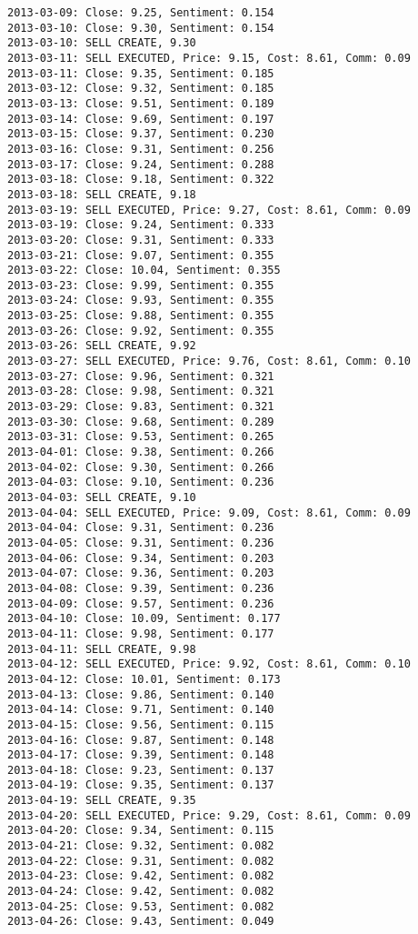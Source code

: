 \documentclass[11pt]{article}
\begin{document}
\begin{Verbatim}[commandchars=\\\{\}]
2013-03-09: Close: 9.25, Sentiment: 0.154
2013-03-10: Close: 9.30, Sentiment: 0.154
2013-03-10: SELL CREATE, 9.30
2013-03-11: SELL EXECUTED, Price: 9.15, Cost: 8.61, Comm: 0.09
2013-03-11: Close: 9.35, Sentiment: 0.185
2013-03-12: Close: 9.32, Sentiment: 0.185
2013-03-13: Close: 9.51, Sentiment: 0.189
2013-03-14: Close: 9.69, Sentiment: 0.197
2013-03-15: Close: 9.37, Sentiment: 0.230
2013-03-16: Close: 9.31, Sentiment: 0.256
2013-03-17: Close: 9.24, Sentiment: 0.288
2013-03-18: Close: 9.18, Sentiment: 0.322
2013-03-18: SELL CREATE, 9.18
2013-03-19: SELL EXECUTED, Price: 9.27, Cost: 8.61, Comm: 0.09
2013-03-19: Close: 9.24, Sentiment: 0.333
2013-03-20: Close: 9.31, Sentiment: 0.333
2013-03-21: Close: 9.07, Sentiment: 0.355
2013-03-22: Close: 10.04, Sentiment: 0.355
2013-03-23: Close: 9.99, Sentiment: 0.355
2013-03-24: Close: 9.93, Sentiment: 0.355
2013-03-25: Close: 9.88, Sentiment: 0.355
2013-03-26: Close: 9.92, Sentiment: 0.355
2013-03-26: SELL CREATE, 9.92
2013-03-27: SELL EXECUTED, Price: 9.76, Cost: 8.61, Comm: 0.10
2013-03-27: Close: 9.96, Sentiment: 0.321
2013-03-28: Close: 9.98, Sentiment: 0.321
2013-03-29: Close: 9.83, Sentiment: 0.321
2013-03-30: Close: 9.68, Sentiment: 0.289
2013-03-31: Close: 9.53, Sentiment: 0.265
2013-04-01: Close: 9.38, Sentiment: 0.266
2013-04-02: Close: 9.30, Sentiment: 0.266
2013-04-03: Close: 9.10, Sentiment: 0.236
2013-04-03: SELL CREATE, 9.10
2013-04-04: SELL EXECUTED, Price: 9.09, Cost: 8.61, Comm: 0.09
2013-04-04: Close: 9.31, Sentiment: 0.236
2013-04-05: Close: 9.31, Sentiment: 0.236
2013-04-06: Close: 9.34, Sentiment: 0.203
2013-04-07: Close: 9.36, Sentiment: 0.203
2013-04-08: Close: 9.39, Sentiment: 0.236
2013-04-09: Close: 9.57, Sentiment: 0.236
2013-04-10: Close: 10.09, Sentiment: 0.177
2013-04-11: Close: 9.98, Sentiment: 0.177
2013-04-11: SELL CREATE, 9.98
2013-04-12: SELL EXECUTED, Price: 9.92, Cost: 8.61, Comm: 0.10
2013-04-12: Close: 10.01, Sentiment: 0.173
2013-04-13: Close: 9.86, Sentiment: 0.140
2013-04-14: Close: 9.71, Sentiment: 0.140
2013-04-15: Close: 9.56, Sentiment: 0.115
2013-04-16: Close: 9.87, Sentiment: 0.148
2013-04-17: Close: 9.39, Sentiment: 0.148
2013-04-18: Close: 9.23, Sentiment: 0.137
2013-04-19: Close: 9.35, Sentiment: 0.137
2013-04-19: SELL CREATE, 9.35
2013-04-20: SELL EXECUTED, Price: 9.29, Cost: 8.61, Comm: 0.09
2013-04-20: Close: 9.34, Sentiment: 0.115
2013-04-21: Close: 9.32, Sentiment: 0.082
2013-04-22: Close: 9.31, Sentiment: 0.082
2013-04-23: Close: 9.42, Sentiment: 0.082
2013-04-24: Close: 9.42, Sentiment: 0.082
2013-04-25: Close: 9.53, Sentiment: 0.082
2013-04-26: Close: 9.43, Sentiment: 0.049

\end{Verbatim}
\end{document}
